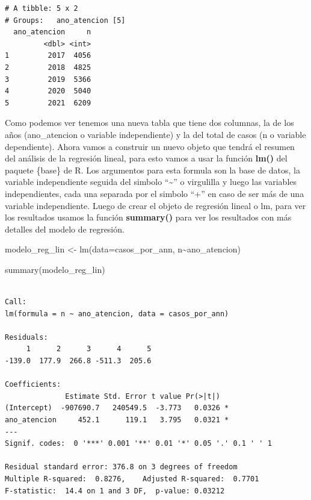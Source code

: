 \documentclass[
  letterpaper,
  DIV=11,
  numbers=noendperiod]{scrreprt}
\newenvironment{Shaded}{\begin{snugshade}}{\end{snugshade}}
\newcommand{\AttributeTok}[1]{\textcolor[rgb]{0.40,0.45,0.13}{#1}}
\newcommand{\FunctionTok}[1]{\textcolor[rgb]{0.28,0.35,0.67}{#1}}
\newcommand{\NormalTok}[1]{\textcolor[rgb]{0.00,0.23,0.31}{#1}}
\newcommand{\OtherTok}[1]{\textcolor[rgb]{0.00,0.23,0.31}{#1}}
\newcommand{\SpecialCharTok}[1]{\textcolor[rgb]{0.37,0.37,0.37}{#1}}
\begin{document}
\begin{verbatim}
# A tibble: 5 x 2
# Groups:   ano_atencion [5]
  ano_atencion     n
         <dbl> <int>
1         2017  4056
2         2018  4825
3         2019  5366
4         2020  5040
5         2021  6209
\end{verbatim}

Como podemos ver tenemos una nueva tabla que tiene dos columnas, la de
los años (ano\_atencion o variable independiente) y la del total de
casos (n o variable dependiente). Ahora vamos a construir un nuevo
objeto que tendrá el resumen del análisis de la regresión lineal, para
esto vamos a usar la función \textbf{lm()} del paquete \{base\} de R.
Los argumentos para esta formula son la base de datos, la variable
independiente seguida del simbolo ``\textasciitilde{}'' o virgulilla y
luego las variables independientes, cada una separada por el simbolo
``+'' en caso de ser más de una variable independiente. Luego de crear
el objeto de regresión lineal o lm, para ver los resultados usamos la
función \textbf{summary()} para ver los resultados con más detalles del
modelo de regresión.

\begin{Shaded}
\begin{Highlighting}[]
\NormalTok{modelo\_reg\_lin }\OtherTok{\textless{}{-}} \FunctionTok{lm}\NormalTok{(}\AttributeTok{data=}\NormalTok{casos\_por\_ann, n}\SpecialCharTok{\textasciitilde{}}\NormalTok{ano\_atencion) }

\FunctionTok{summary}\NormalTok{(modelo\_reg\_lin)}
\end{Highlighting}
\end{Shaded}

\begin{verbatim}

Call:
lm(formula = n ~ ano_atencion, data = casos_por_ann)

Residuals:
     1      2      3      4      5 
-139.0  177.9  266.8 -511.3  205.6 

Coefficients:
              Estimate Std. Error t value Pr(>|t|)  
(Intercept)  -907690.7   240549.5  -3.773   0.0326 *
ano_atencion     452.1      119.1   3.795   0.0321 *
---
Signif. codes:  0 '***' 0.001 '**' 0.01 '*' 0.05 '.' 0.1 ' ' 1

Residual standard error: 376.8 on 3 degrees of freedom
Multiple R-squared:  0.8276,    Adjusted R-squared:  0.7701 
F-statistic:  14.4 on 1 and 3 DF,  p-value: 0.03212
\end{verbatim}
\end{document}
